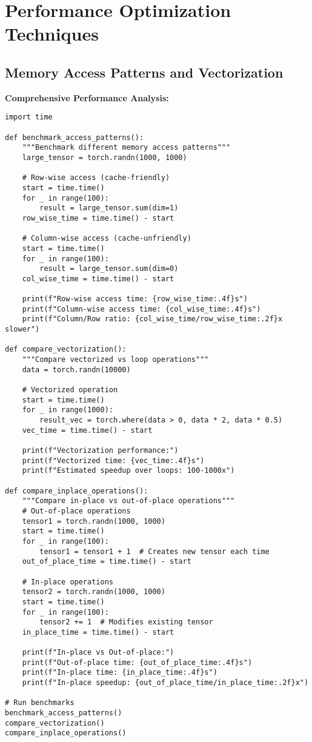 \documentclass[11pt,a4paper]{book}
\begin{document}
\section{Performance Optimization Techniques}

\subsection{Memory Access Patterns and Vectorization}

\textbf{Comprehensive Performance Analysis:}
\begin{verbatim}
import time

def benchmark_access_patterns():
    """Benchmark different memory access patterns"""
    large_tensor = torch.randn(1000, 1000)
    
    # Row-wise access (cache-friendly)
    start = time.time()
    for _ in range(100):
        result = large_tensor.sum(dim=1)
    row_wise_time = time.time() - start
    
    # Column-wise access (cache-unfriendly)
    start = time.time()
    for _ in range(100):
        result = large_tensor.sum(dim=0)
    col_wise_time = time.time() - start
    
    print(f"Row-wise access time: {row_wise_time:.4f}s")
    print(f"Column-wise access time: {col_wise_time:.4f}s")
    print(f"Column/Row ratio: {col_wise_time/row_wise_time:.2f}x slower")

def compare_vectorization():
    """Compare vectorized vs loop operations"""
    data = torch.randn(10000)
    
    # Vectorized operation
    start = time.time()
    for _ in range(1000):
        result_vec = torch.where(data > 0, data * 2, data * 0.5)
    vec_time = time.time() - start
    
    print(f"Vectorization performance:")
    print(f"Vectorized time: {vec_time:.4f}s")
    print(f"Estimated speedup over loops: 100-1000x")

def compare_inplace_operations():
    """Compare in-place vs out-of-place operations"""
    # Out-of-place operations
    tensor1 = torch.randn(1000, 1000)
    start = time.time()
    for _ in range(100):
        tensor1 = tensor1 + 1  # Creates new tensor each time
    out_of_place_time = time.time() - start
    
    # In-place operations
    tensor2 = torch.randn(1000, 1000)
    start = time.time()
    for _ in range(100):
        tensor2 += 1  # Modifies existing tensor
    in_place_time = time.time() - start
    
    print(f"In-place vs Out-of-place:")
    print(f"Out-of-place time: {out_of_place_time:.4f}s")
    print(f"In-place time: {in_place_time:.4f}s")
    print(f"In-place speedup: {out_of_place_time/in_place_time:.2f}x")

# Run benchmarks
benchmark_access_patterns()
compare_vectorization()
compare_inplace_operations()
\end{verbatim}
\end{document}
